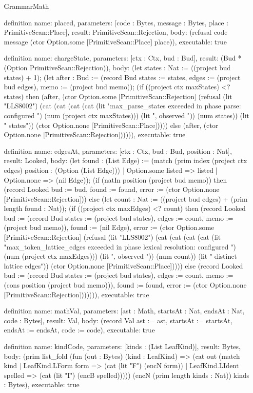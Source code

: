 \begin{lexlean}{GrammarMath}
\begin{semanticmodule}
definition{
  name: placed,
  parameters: [code : Bytes, message : Bytes, place : PrimitiveScan::Place],
  result: PrimitiveScan::Rejection,
  body: (refusal code message (ctor Option.some [PrimitiveScan::Place] place)),
  executable: true
}

definition{
  name: chargeState,
  parameters: [ctx : Ctx, bud : Bud],
  result: (Bud * (Option PrimitiveScan::Rejection)),
  body: (let states : Nat := ((project bud states) + 1); (let after : Bud := (record Bud {states := states, edges := (project bud edges), memo := (project bud memo)}); (if ((project ctx maxStates) <? states) then (after, (ctor Option.some [PrimitiveScan::Rejection] (refusal (lit "LLS8002") (cat (cat (cat (cat (lit "max_parse_states exceeded in phase parse: configured ") (num (project ctx maxStates))) (lit ", observed ")) (num states)) (lit " states")) (ctor Option.none [PrimitiveScan::Place])))) else (after, (ctor Option.none [PrimitiveScan::Rejection]))))),
  executable: true
}

definition{
  name: edgesAt,
  parameters: [ctx : Ctx, bud : Bud, position : Nat],
  result: Looked,
  body: (let found : (List Edge) := (match (prim index (project ctx edges) position : (Option (List Edge)))
    | Option.some listed => listed
    | Option.none => (nil Edge)); (if (natIn position (project bud memo)) then (record Looked {bud := bud, found := found, error := (ctor Option.none [PrimitiveScan::Rejection])}) else (let count : Nat := ((project bud edges) + (prim length found : Nat)); (if ((project ctx maxEdges) <? count) then (record Looked {bud := (record Bud {states := (project bud states), edges := count, memo := (project bud memo)}), found := (nil Edge), error := (ctor Option.some [PrimitiveScan::Rejection] (refusal (lit "LLS8002") (cat (cat (cat (cat (lit "max_token_lattice_edges exceeded in phase lexical resolution: configured ") (num (project ctx maxEdges))) (lit ", observed ")) (num count)) (lit " distinct lattice edges")) (ctor Option.none [PrimitiveScan::Place])))}) else (record Looked {bud := (record Bud {states := (project bud states), edges := count, memo := (cons position (project bud memo))}), found := found, error := (ctor Option.none [PrimitiveScan::Rejection])}))))),
  executable: true
}

definition{
  name: mathVal,
  parameters: [ast : Math, startsAt : Nat, endsAt : Nat, code : Bytes],
  result: Val,
  body: (record Val {ast := ast, startsAt := startsAt, endsAt := endsAt, code := code}),
  executable: true
}

definition{
  name: kindCode,
  parameters: [kinds : (List LeafKind)],
  result: Bytes,
  body: (prim list_fold (fun (out : Bytes) (kind : LeafKind) => (cat out (match kind
    | LeafKind.LForm form => (cat (lit "F") (encN form))
    | LeafKind.LIdent spelled => (cat (lit "I") (encB spelled))))) (encN (prim length kinds : Nat)) kinds : Bytes),
  executable: true
}


\end{semanticmodule}
\end{lexlean}
